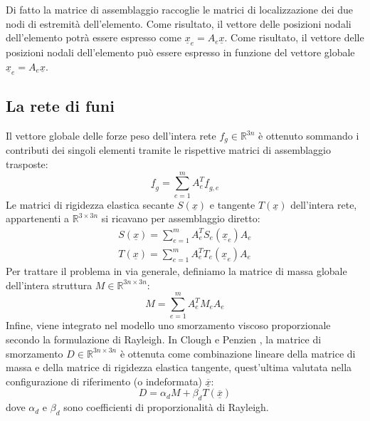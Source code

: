 \vspace{1em}
Di fatto la matrice di assemblaggio raccoglie le matrici di localizzazione dei due nodi di estremità dell'elemento. Come risultato, il vettore delle posizioni nodali dell'elemento potrà essere espresso come $\underline{x}_e = A_e \underline{x}$.
Come risultato, il vettore delle posizioni nodali dell'elemento può essere espresso in funzione del vettore globale $\underline{x}_e = A_e \underline{x}$. 

\subsection{La rete di funi}
Il vettore globale delle forze peso dell'intera rete $f_g \in \mathbb{R}^{3n}$ è ottenuto sommando i contributi dei singoli elementi tramite le rispettive matrici di assemblaggio trasposte:
\begin{equation}
 \underline{f}_{g} = \sum_{e=1}^{m} A_e^T \underline{f}_{g,e}
 \label{eq:vettore_peso}
\end{equation}
Le matrici di rigidezza elastica secante $S(\underline{x})$ e tangente $T(\underline{x})$ dell'intera rete, appartenenti a $\mathbb{R}^{3 \times 3n}$ si ricavano per assemblaggio diretto:
\begin{equation}
   \begin{aligned}
   S(\underline{x}) = \sum_{e=1}^{m} A_e^T S_e(\underline{x}_{e})A_e\\
   T(\underline{x}) = \sum_{e=1}^{m} A_e^T T_e(\underline{x}_{e})A_e
    \end{aligned}
   \label{eq:matrice_rigidezza}
\end{equation}
Per trattare il problema in via generale, definiamo la matrice di massa globale dell'intera struttura $M \in \mathbb{R}^{3n \times 3n}$: 
\begin{equation}
   M = \sum_{e=1}^{m} A_e^T M_e A_e
   \label{eq:matrice_massa}
\end{equation}
Infine, viene integrato nel modello uno smorzamento viscoso proporzionale secondo la formulazione di Rayleigh. In Clough e Penzien \cite{Penzien}, la matrice di smorzamento $D \in \mathbb{R}^{3n \times 3n}$ è ottenuta come combinazione lineare della matrice di massa e della matrice di rigidezza elastica tangente, quest'ultima valutata nella configurazione di riferimento (o indeformata) $\underline{\overline{x}}$: 
\begin{equation}
   D = \alpha_d M + \beta_d T(\underline{\overline{x}})
   \label{eq:matrice_smorzamento}
\end{equation}
dove $\alpha_d$ e $\beta_d$ sono coefficienti di proporzionalità di Rayleigh.

